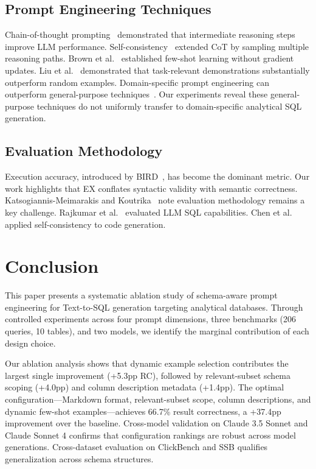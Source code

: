 \documentclass[sigconf, nonacm]{acmart}
\begin{document}
\subsection{Prompt Engineering Techniques}
Chain-of-thought prompting~\cite{wei2022cot} demonstrated that intermediate reasoning steps improve LLM performance. Self-consistency~\cite{wang2023selfconsistency} extended CoT by sampling multiple reasoning paths. Brown et al.~\cite{brown2020gpt3} established few-shot learning without gradient updates. Liu et al.~\cite{liu2022incontext} demonstrated that task-relevant demonstrations substantially outperform random examples. Domain-specific prompt engineering can outperform general-purpose techniques~\cite{liu2023prompting}. Our experiments reveal these general-purpose techniques do not uniformly transfer to domain-specific analytical SQL generation.

\subsection{Evaluation Methodology}
Execution accuracy, introduced by BIRD~\cite{li2024bird}, has become the dominant metric. Our work highlights that EX conflates syntactic validity with semantic correctness. Katsogiannis-Meimarakis and Koutrika~\cite{katsogiannis2023survey} note evaluation methodology remains a key challenge. Rajkumar et al.~\cite{rajkumar2022evaluating} evaluated LLM SQL capabilities. Chen et al.~\cite{chen2023codet} applied self-consistency to code generation.

\section{Conclusion}
\label{sec:conclusion}

This paper presents a systematic ablation study of schema-aware prompt engineering for Text-to-SQL generation targeting analytical databases. Through controlled experiments across four prompt dimensions, three benchmarks (206 queries, 10 tables), and two models, we identify the marginal contribution of each design choice.

Our ablation analysis shows that dynamic example selection contributes the largest single improvement (+5.3pp RC), followed by relevant-subset schema scoping (+4.0pp) and column description metadata (+1.4pp). The optimal configuration---Markdown format, relevant-subset scope, column descriptions, and dynamic few-shot examples---achieves 66.7\% result correctness, a +37.4pp improvement over the baseline. Cross-model validation on Claude 3.5 Sonnet and Claude Sonnet 4 confirms that configuration rankings are robust across model generations. Cross-dataset evaluation on ClickBench and SSB qualifies generalization across schema structures.
\end{document}
